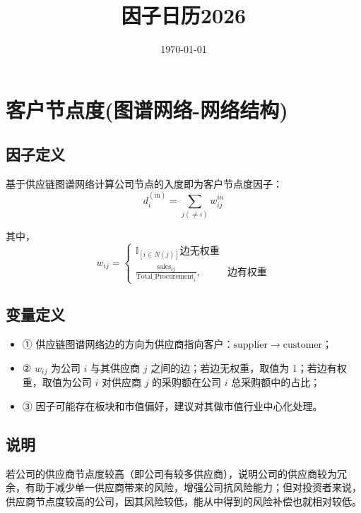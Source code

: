 \documentclass{article}
\title{因子日历2026}
\date{\today}
\begin{document}
\maketitle

\section{客户节点度(图谱网络-网络结构)}

\subsection{因子定义}

基于供应链图谱网络计算公司节点的入度即为客户节点度因子：
\begin{equation}
    d^{\mathrm{(in)}}_i = \sum_{j (\neq i)} w_{ij}^{in}
\end{equation}

其中，
\begin{equation}
    w_{ij} = 
    \begin{cases}
        \mathbb{I}_{[i \in N(j)]} \text{边无权重}\\
        \frac{\mathrm{sales}_{ij}}{\mathrm{Total\_Procurement}_i}, & \text{边有权重}
    \end{cases}
\end{equation}

\subsection{变量定义}
\begin{itemize}
    \item ① 供应链图谱网络边的方向为供应商指向客户：\(\mathrm{supplier} \rightarrow \mathrm{customer}\)；
    \item ② \( w_{ij} \) 为公司 \( i \) 与其供应商 \( j \) 之间的边；若边无权重，取值为 1；若边有权重，取值为公司 \( i \) 对供应商 \( j \) 的采购额在公司 \( i \) 总采购额中的占比；
    \item ③ 因子可能存在板块和市值偏好，建议对其做市值行业中心化处理。
\end{itemize}

\subsection{说明}
若公司的供应商节点度较高（即公司有较多供应商），说明公司的供应商较为冗余，有助于减少单一供应商带来的风险，增强公司抗风险能力；但对投资者来说，供应商节点度较高的公司，因其风险较低，能从中得到的风险补偿也就相对较低。
\end{document}
